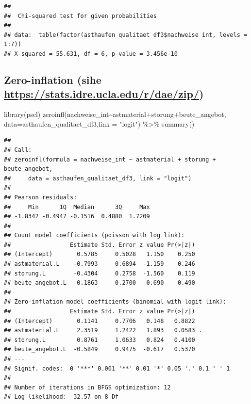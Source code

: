 \documentclass[
  oneside]{scrbook}
\newenvironment{Shaded}{\begin{snugshade}}{\end{snugshade}}
\newcommand{\AttributeTok}[1]{\textcolor[rgb]{0.77,0.63,0.00}{#1}}
\newcommand{\FunctionTok}[1]{\textcolor[rgb]{0.00,0.00,0.00}{#1}}
\newcommand{\NormalTok}[1]{#1}
\newcommand{\SpecialCharTok}[1]{\textcolor[rgb]{0.00,0.00,0.00}{#1}}
\newcommand{\StringTok}[1]{\textcolor[rgb]{0.31,0.60,0.02}{#1}}
\begin{document}
\begin{verbatim}
## 
##  Chi-squared test for given probabilities
## 
## data:  table(factor(asthaufen_qualitaet_df3$nachweise_int, levels = 1:7))
## X-squared = 55.631, df = 6, p-value = 3.456e-10
\end{verbatim}

\hypertarget{zero-inflation-sihe-httpsstats.idre.ucla.edurdaezip}{%
\subsection{\texorpdfstring{Zero-inflation (sihe \url{https://stats.idre.ucla.edu/r/dae/zip/})}{Zero-inflation (sihe https://stats.idre.ucla.edu/r/dae/zip/)}}\label{zero-inflation-sihe-httpsstats.idre.ucla.edurdaezip}}

\begin{Shaded}
\begin{Highlighting}[]
\FunctionTok{library}\NormalTok{(pscl)}
\FunctionTok{zeroinfl}\NormalTok{(nachweise\_int}\SpecialCharTok{\textasciitilde{}}\NormalTok{astmaterial}\SpecialCharTok{+}\NormalTok{storung}\SpecialCharTok{+}\NormalTok{beute\_angebot,}
                       \AttributeTok{data=}\NormalTok{asthaufen\_qualitaet\_df3,}\AttributeTok{link =} \StringTok{"logit"}\NormalTok{) }\SpecialCharTok{\%\textgreater{}\%}
  \FunctionTok{summary}\NormalTok{()}
\end{Highlighting}
\end{Shaded}

\begin{verbatim}
## 
## Call:
## zeroinfl(formula = nachweise_int ~ astmaterial + storung + beute_angebot, 
##     data = asthaufen_qualitaet_df3, link = "logit")
## 
## Pearson residuals:
##     Min      1Q  Median      3Q     Max 
## -1.8342 -0.4947 -0.1516  0.4880  1.7209 
## 
## Count model coefficients (poisson with log link):
##                 Estimate Std. Error z value Pr(>|z|)
## (Intercept)       0.5785     0.5028   1.150    0.250
## astmaterial.L    -0.7993     0.6894  -1.159    0.246
## storung.L        -0.4304     0.2758  -1.560    0.119
## beute_angebot.L   0.1863     0.2700   0.690    0.490
## 
## Zero-inflation model coefficients (binomial with logit link):
##                 Estimate Std. Error z value Pr(>|z|)  
## (Intercept)       0.1141     0.7706   0.148   0.8822  
## astmaterial.L     2.3519     1.2422   1.893   0.0583 .
## storung.L         0.8761     1.0633   0.824   0.4100  
## beute_angebot.L  -0.5849     0.9475  -0.617   0.5370  
## ---
## Signif. codes:  0 '***' 0.001 '**' 0.01 '*' 0.05 '.' 0.1 ' ' 1 
## 
## Number of iterations in BFGS optimization: 12 
## Log-likelihood: -32.57 on 8 Df
\end{verbatim}
\end{document}
